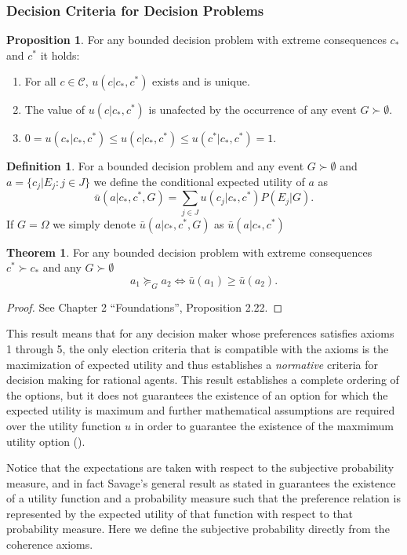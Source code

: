 \documentclass[english,letterpaper,12pt,final]{article}
\theoremstyle{definition}
\newtheorem{teo}{Theorem}[section]
\newtheorem{prop}{Proposition}[section]
\newtheorem{defi}{Definition}[section]
\begin{document}
	\subsubsection{Decision Criteria for Decision Problems}
	\begin{prop}
	For any bounded decision problem with extreme consequences $c_\ast$ and $c^\ast$ it holds:
	\begin{enumerate}[label=(\roman*)]
	\item For all $c \in \mathcal{C}$, $u(c | c_\ast, c^\ast)$ exists and is unique.
	\item The value of $u(c | c_\ast, c^\ast)$ is unafected by the occurrence of any event $G \succ \emptyset$.
	\item $0 = u(c_\ast | c_\ast, c^\ast) \leq u(c | c_\ast, c^\ast) \leq u(c^\ast | c_\ast, c^\ast) = 1$.
	\end{enumerate}
	\end{prop}
	\begin{defi}
	For a bounded decision problem and any event $G \succ \emptyset$ and $a = \{ c_j | E_j : j \in J \}$ we define the conditional expected utility of $a$ as
	\[ \bar{u}(a | c_\ast, c^\ast, G) = \sum_{j \in J} u(c_j | c_\ast, c^\ast)P(E_j | G). \]
	If $G = \Omega$ we simply denote $\bar{u}(a | c_\ast, c^\ast, G)$ as $\bar{u}(a | c_\ast, c^\ast)$
	\end{defi}
	
	\begin{teo}
	For any bounded decision problem with extreme consequences $c^\ast \succ c_\ast$ and any $G \succ \emptyset$
	\[ a_1 \succeq_G a_2 \Leftrightarrow \bar{u}(a_1) \geq \bar{u}(a_2). \]
	\end{teo}
	\begin{proof}
	See \cite{bernardo2000bayesian} Chapter 2 “Foundations”, Proposition 2.22.
	\end{proof}
	This result means that for any decision maker whose preferences satisfies axioms 1 through 5, the only election criteria that is compatible with the axioms is the maximization of expected utility and thus establishes a \textit{normative} criteria for decision making for rational agents. This result establishes a complete ordering of the options, but it does not guarantees the existence of an option for which the expected utility is maximum and further mathematical assumptions are required over the utility function $u$ in order to guarantee the existence of the maxmimum utility option (\cite{bernardo2000bayesian}).
	
	Notice that the expectations are taken with respect to the subjective probability measure, and in fact Savage's general result as stated in \cite{gilboa2009decision} guarantees the existence of a utility function and a probability measure such that the preference relation is represented by the expected utility of that function with respect to that probability measure. Here we define the subjective probability directly from the coherence axioms.
	
\end{document}
